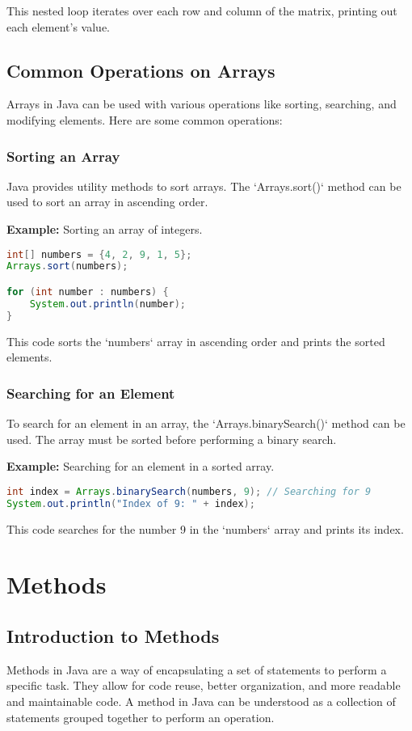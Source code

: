 \documentclass{article}
\begin{document}
This nested loop iterates over each row and column of the matrix, printing out each element's value.



\newpage
\subsection{Common Operations on Arrays}
Arrays in Java can be used with various operations like sorting, searching, and modifying elements. Here are some common operations:

\subsubsection{Sorting an Array}
Java provides utility methods to sort arrays. The `Arrays.sort()` method can be used to sort an array in ascending order.

\textbf{Example:} Sorting an array of integers.

\begin{lstlisting}[language=Java]
int[] numbers = {4, 2, 9, 1, 5};
Arrays.sort(numbers);

for (int number : numbers) {
    System.out.println(number);
}
\end{lstlisting}

This code sorts the `numbers` array in ascending order and prints the sorted elements.

\subsubsection{Searching for an Element}
To search for an element in an array, the `Arrays.binarySearch()` method can be used. The array must be sorted before performing a binary search.

\textbf{Example:} Searching for an element in a sorted array.

\begin{lstlisting}[language=Java]
int index = Arrays.binarySearch(numbers, 9); // Searching for 9
System.out.println("Index of 9: " + index);
\end{lstlisting}

This code searches for the number 9 in the `numbers` array and prints its index.



\newpage
\section{Methods}
\subsection{Introduction to Methods}
Methods in Java are a way of encapsulating a set of statements to perform a specific task. They allow for code reuse, better organization, and more readable and maintainable code. A method in Java can be understood as a collection of statements grouped together to perform an operation.
\end{document}
